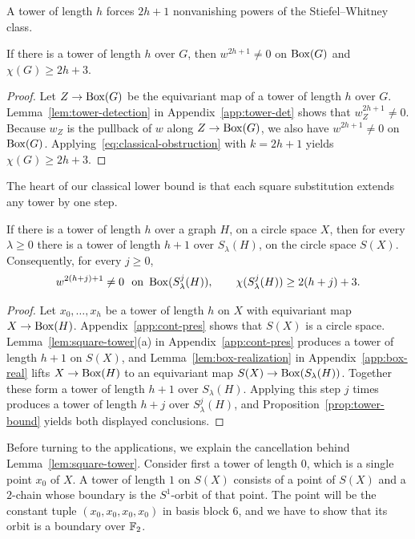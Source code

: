 A tower of length $h$ forces $2h+1$ nonvanishing powers of the Stiefel--Whitney class.

\begin{proposition}\label{prop:tower-bound}
If there is a tower of length $h$ over $G$, then $w^{2h+1}\ne0$ on $\operatorname{Box}(G)$ and $\chi(G)\ge2h+3$.
\end{proposition}
\begin{proof}
Let $Z\to\operatorname{Box}(G)$ be the equivariant map of a tower of length $h$ over $G$. Lemma~\ref{lem:tower-detection} in Appendix~\ref{app:tower-det} shows that $w_Z^{2h+1}\ne0$. Because $w_Z$ is the pullback of $w$ along $Z\to\operatorname{Box}(G)$, we also have $w^{2h+1}\ne0$ on $\operatorname{Box}(G)$. Applying~\eqref{eq:classical-obstruction} with $k=2h+1$ yields $\chi(G)\ge2h+3$.
\end{proof}

The heart of our classical lower bound is that each square substitution extends any tower by one step.

\begin{theorem}\label{thm:step}
If there is a tower of length $h$ over a graph $H$, on a circle space $X$, then for every $\lambda\ge0$ there is a tower of length $h+1$ over $S_\lambda(H)$, on the circle space $S(X)$. Consequently, for every $j\ge0$,
\[
 w^{2(h+j)+1}\ne0\ \text{ on }\operatorname{Box}(S^j_\lambda(H)),\qquad \chi(S^j_\lambda(H))\ge2(h+j)+3.
\]
\end{theorem}
\begin{proof}
Let $x_0,\ldots,x_h$ be a tower of length $h$ on $X$ with equivariant map $X\to\operatorname{Box}(H)$. Appendix~\ref{app:cont-pres} shows that $S(X)$ is a circle space. Lemma~\ref{lem:square-tower}(a) in Appendix~\ref{app:cont-pres} produces a tower of length $h+1$ on $S(X)$, and Lemma~\ref{lem:box-realization} in Appendix~\ref{app:box-real} lifts $X\to\operatorname{Box}(H)$ to an equivariant map $S(X)\to\operatorname{Box}(S_\lambda(H))$. Together these form a tower of length $h+1$ over $S_\lambda(H)$. Applying this step $j$ times produces a tower of length $h+j$ over $S^j_\lambda(H)$, and Proposition~\ref{prop:tower-bound} yields both displayed conclusions.
\end{proof}

Before turning to the applications, we explain the cancellation behind Lemma~\ref{lem:square-tower}. Consider first a tower of length $0$, which is a single point $x_0$ of $X$. A tower of length $1$ on $S(X)$ consists of a point of $S(X)$ and a $2$-chain whose boundary is the $S^1$-orbit of that point. The point will be the constant tuple $(x_0,x_0,x_0,x_0)$ in basis block $6$, and we have to show that its orbit is a boundary over $\mathbb F_2$.


